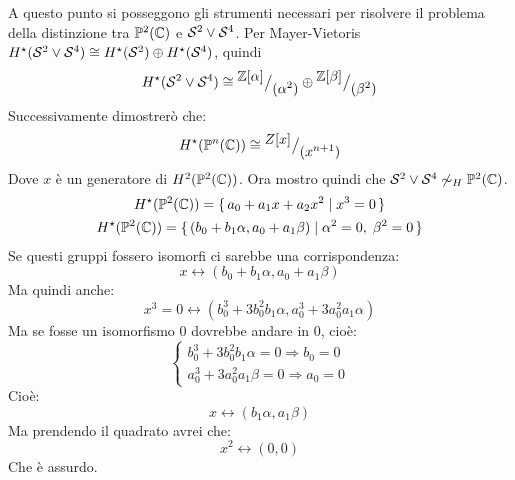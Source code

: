 \begin{example}
  A questo punto si posseggono gli strumenti necessari per risolvere il problema della
  distinzione tra $ \mathbb{P}^{2} (\mathbb{C}) $ e $ \mathcal{S}^{2} \vee \mathcal{S}^{4} $.
  Per Mayer-Vietoris $ H^\star(\mathcal{S}^{2} \vee \mathcal{S}^{4}) \cong H^\star(\mathcal{S}^{2}) \oplus H^\star(\mathcal{S}^{4}) $, quindi
  \[
    H^\star(\mathcal{S}^{2} \vee \mathcal{S}^{4}) \cong {^{\textstyle \mathbb{Z}[\alpha]}\big/_{\textstyle (\alpha^2)}} \oplus {^{\textstyle \mathbb{Z}[\beta]}\big/_{\textstyle (\beta^2)}}
  \]
  Successivamente dimostrerò che:
  \[
    H^\star(\mathbb{P}^{n} (\mathbb{C})) \cong {^{\textstyle Z[x]}\big/_{\textstyle (x^{n+1})}}
  \]
  Dove $ x $ è un generatore di $ H^{2}(\mathbb{P}^{2} (\mathbb{C})) $.
  Ora mostro quindi che $ \mathcal{S}^{2} \vee \mathcal{S}^{4} \not \sim_H \mathbb{P}^{2} (\mathbb{C}) $.
  \begin{gather*}
    H^\star(\mathbb{P}^{2} (\mathbb{C})) = \set{a_0 + a_1 x + a_2 x^2 | x^3 = 0} \\
    H^\star(\mathbb{P}^{2} (\mathbb{C})) = \set{(b_0 + b_1 \alpha, a_0 + a_1 \beta) | \alpha^2 = 0, \; \beta^2 = 0}
  \end{gather*}
  Se questi gruppi fossero isomorfi ci sarebbe una corrispondenza:
  \[
    x \leftrightarrow (b_0 + b_1 \alpha, a_0 + a_1 \beta)
  \]
  Ma quindi anche:
  \[
    x^3 = 0 \leftrightarrow (b_0^3 + 3 b_0^2 b_1 \alpha, a_0^3 + 3 a_0^2 a_1 \alpha)
  \]
  Ma se fosse un isomorfismo $ 0 $ dovrebbe andare in $ 0 $, cioè:
  \[
    \begin{cases}
      b_0^3 + 3 b_0^2 b_1 \alpha = 0 \Rightarrow b_0 = 0  \\
      a_0^3 + 3 a_0^2 a_1 \beta = 0 \Rightarrow a_0 = 0
    \end{cases}
  \]
  Cioè:
  \[
    x \leftrightarrow  (b_1 \alpha, a_1 \beta)
  \]
  Ma prendendo il quadrato avrei che:
  \[
    x^2 \leftrightarrow  (0, 0)
  \]
  Che è assurdo.
\end{example}

